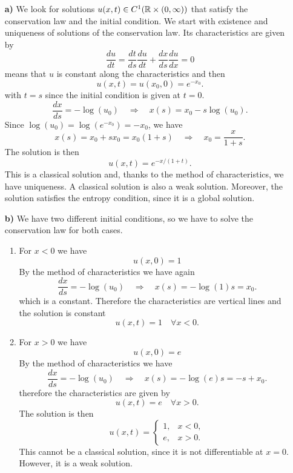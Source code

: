\begin{itemize}
    \item[\textbf{a)}] We look for solutions \(u(x, t) \in C^1(\mathbb{R} \times (0, \infty))\) that satisfy the conservation law and the initial condition. 
    We start with existence and uniqueness of solutions of the conservation law.
    Its characteristics are given by
    \[
        \frac{du}{dt} = \frac{dt}{ds} \frac{du}{dt} + \frac{dx}{ds} \frac{du}{dx} = 0
    \]
    means that \(u\) is constant along the characteristics and then 
    \[
        u(x,t) = u(x_0,0) = e^{-x_0}.
    \]
    with \(t=s\) since the initial condition is given at \(t=0\). 
    \[
        \frac{dx}{ds} = -\log(u_0) \quad \Rightarrow \quad x(s) = x_0 - s \log(u_0).
    \]
    Since \(\log(u_0) = \log(e^{-x_0}) = -x_0\), we have
    \[
        x(s) = x_0 + s x_0 = x_0(1+s) \quad \Rightarrow \quad x_0 = \frac{x}{1+s}.
    \]
    The solution is then
    \[
        u(x,t) = e^{-x/(1+t)}.
    \]
    This is a classical solution and, thanks to the method of characteristics, we have uniqueness. A classical solution is also a weak solution. Moreover, the solution satisfies the entropy condition, since it is a global solution.
    \item[\textbf{b)}] We have two different initial conditions, so we have to solve the conservation law for both cases. 
    \begin{enumerate}
        \item For \(x < 0\) we have
        \[
            u(x,0) = 1
        \]
        By the method of characteristics we have again 
        \[
            \frac{dx}{ds} = -\log(u_0) \quad \Rightarrow \quad x(s) = -\log(1)s = x_0.
        \]
        which is a constant. Therefore the characteristics are vertical lines and the solution is constant 
        \[
            u(x,t) = 1 \quad \forall x < 0.
        \]
        \item For \(x > 0\) we have
        \[
            u(x,0) = e
        \]
        By the method of characteristics we have
        \[
            \frac{dx}{ds} = -\log(u_0) \quad \Rightarrow \quad x(s) = -\log(e)s = -s + x_0.
        \]
        therefore the characteristics are given by
        \[
            u(x,t) = e \quad \forall x > 0.
        \]
        The solution is then
        \[
            u(x,t) = \begin{cases}
                1, & x < 0, \\
                e, & x > 0.
            \end{cases}
        \]
        This cannot be a classical solution, since it is not differentiable at \(x=0\). However, it is a weak solution. 

\end{enumerate}
\end{itemize}
